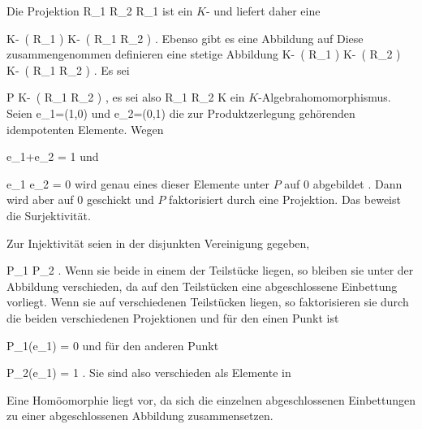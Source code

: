 {





Die Projektion
\maabb {} {R_1 \times R_2 } { R_1
} {}
ist ein
$K$-
und liefert daher  {} {} eine

 {} {}
\maabbdisp {} { K\!-\!\, \left(   R_1   \right)  } { K\!-\!\, \left(   R_1 \times R_2   \right)
} {.}
Ebenso gibt es eine Abbildung auf
 Diese zusammengenommen definieren eine stetige Abbildung
\maabbdisp {} { K\!-\!\, \left(   R_1   \right)  \uplus K\!-\!\, \left(   R_2   \right) } { K\!-\!\, \left(   R_1 \times R_2   \right)
} {.}
Es sei

\mavergleichskette
{\vergleichskette
{ P
}
{ \in }{ K\!-\!\, \left(   R_1 \times R_2   \right)
}
{  }{
}
{    }{
}
{   }{
}
}
{}{}{,}
es sei also
 { R_1 \times R_2 } { K
} {}
ein $K$-Algebra\-homomorphismus. Seien
\mathkor {} {e_1=(1,0)} {und} {e_2=(0,1)} {}
die zur Produktzerlegung gehörenden idempotenten Elemente. Wegen

\mavergleichskette
{\vergleichskette
{ e_1+e_2
}
{ = }{ 1
}
{  }{
}
{    }{
}
{   }{
}
}
{}{}{}
und

\mavergleichskette
{\vergleichskette
{ e_1 e_2
}
{ = }{ 0
}
{  }{
}
{    }{
}
{   }{
}
}
{}{}{}
wird genau eines dieser Elemente
 {} {}
unter $P$ auf $0$ abgebildet
 {} {.}
Dann wird aber
 auf $0$ geschickt und $P$ faktorisiert durch eine Projektion. Das beweist die Surjektivität.

Zur Injektivität seien
 in der disjunkten Vereinigung gegeben,

\mavergleichskette
{\vergleichskette
{ P_1
}
{ \neq }{ P_2
}
{  }{
}
{    }{
}
{   }{}
}
{}{}{.}
Wenn sie beide in einem der Teilstücke liegen, so bleiben sie unter der Abbildung verschieden, da auf den Teilstücken eine abgeschlossene Einbettung vorliegt. Wenn sie auf verschiedenen Teilstücken liegen, so faktorisieren sie durch die beiden verschiedenen Projektionen und für den einen Punkt ist

\mavergleichskette
{\vergleichskette
{ P_1(e_1)
}
{ = }{ 0
}
{  }{
}
{    }{
}
{   }{
}
}
{}{}{}
und für den anderen Punkt

\mavergleichskette
{\vergleichskette
{ P_2(e_1)
}
{ = }{ 1
}
{  }{
}
{    }{
}
{   }{
}
}
{}{}{.}
Sie sind also verschieden als Elemente in

Eine Homöomorphie liegt vor, da sich die einzelnen abgeschlossenen Einbettungen zu einer abgeschlossenen Abbildung zusammensetzen.




}






